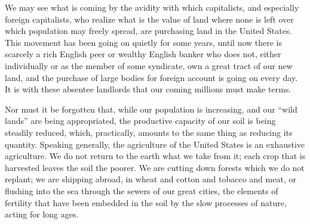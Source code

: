 \documentclass{book}
\begin{document}
We may see what is coming by the avidity with which capitalists, and especially foreign capitalists, who realize what is the value of land where none is left over which population may freely spread, are purchasing land in the United States. This movement has been going on quietly for some years, until now there is scarcely a rich English peer or wealthy English banker who does not, either individually or as the member of some syndicate, own a great tract of our new land, and the purchase of large bodies for foreign account is going on every day. It is with these absentee landlords that our coming millions must make terms.

Nor must it be forgotten that, while our population is increasing, and our “wild lands” are being appropriated, the productive capacity of our soil is being steadily reduced, which, practically, amounts to the same thing as reducing its quantity. Speaking generally, the agriculture of the United States is an exhaustive agriculture. We do not return to the earth what we take from it; each crop that is harvested leaves the soil the poorer. We are cutting down forests which we do not replant; we are shipping abroad, in wheat and cotton and tobacco and meat, or flushing into the sea through the sewers of our great cities, the elements of fertility that have been embedded in the soil by the slow processes of nature, acting for long ages.
\end{document}
